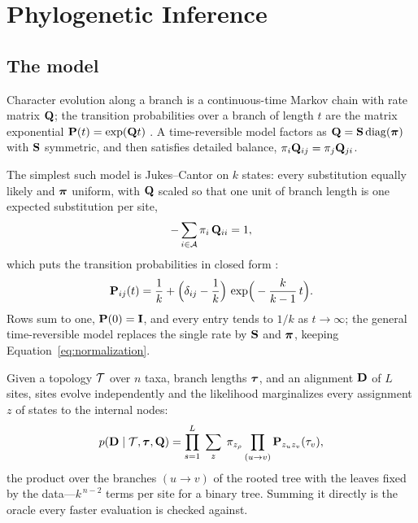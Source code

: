 \documentclass[11pt,a4paper]{article}
\begin{document}
\section{Phylogenetic Inference}
\label{sec:phylo}

\subsection{The model}
\label{sec:phylo:model}
Character evolution along a branch is a continuous-time Markov chain with rate
matrix $\mathbf{Q}$; the transition probabilities over a branch of length $t$ are the
matrix exponential $\mathbf{P}(t) = \exp(\mathbf{Q} t)$ \citep{felsenstein2004}. A
time-reversible model factors as $\mathbf{Q} = \mathbf{S} \operatorname{diag}(\boldsymbol{\pi})$ with
$\mathbf{S}$ symmetric, and then satisfies detailed balance,
$\pi_i \mathbf{Q}_{ij} = \pi_j \mathbf{Q}_{ji}$.

The simplest such model is Jukes--Cantor on $k$ states: every substitution
equally likely and $\boldsymbol{\pi}$ uniform, with $\mathbf{Q}$ scaled so that one unit of branch
length is one expected substitution per site,
\begin{equation}
  -\sum_{i \in \mathcal{A}} \pi_i\, \mathbf{Q}_{ii} = 1,
  \label{eq:normalization}
\end{equation}
which puts the transition probabilities in closed form
\citep{felsenstein2004, durbin1998}:
\begin{equation}
  \mathbf{P}_{ij}(t) = \frac{1}{k} + \Big(\delta_{ij} - \frac{1}{k}\Big)\,
                  \exp\!\Big(-\frac{k}{k-1}\, t\Big).
  \label{eq:jc}
\end{equation}
Rows sum to one, $\mathbf{P}(0) = \mathbf{I}$, and every entry tends to $1/k$ as
$t \to \infty$; the general time-reversible model replaces the single rate by
$\mathbf{S}$ and $\boldsymbol{\pi}$, keeping Equation~\ref{eq:normalization}.

Given a topology $\mathcal{T}$ over $n$ taxa, branch lengths $\boldsymbol{\tau}$, and an
alignment $\mathbf{D}$ of $L$ sites, sites evolve independently and the likelihood
marginalizes every assignment $z$ of states to the internal nodes:
\begin{equation}
  p(\mathbf{D} \mid \mathcal{T}, \boldsymbol{\tau}, \mathbf{Q})
    = \prod_{s=1}^{L} \;\sum_{z}\; \pi_{z_{\rho}}
      \prod_{(u \to v)} \mathbf{P}_{z_u z_v}(\tau_v),
  \label{eq:site-independence}
\end{equation}
the product over the branches $(u \to v)$ of the rooted tree with the leaves
fixed by the data---$k^{\,n-2}$ terms per site for a binary tree. Summing it
directly is the oracle every faster evaluation is checked against.
\end{document}
